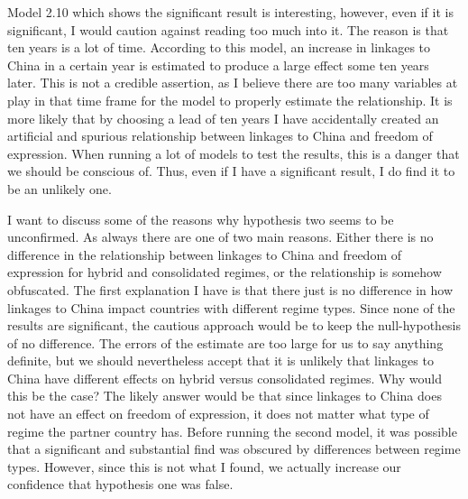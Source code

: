 Model 2.10 which shows the significant result is interesting, however, even if it is significant, I would caution against reading too much into it. The reason is that ten years is a lot of time. According to this model, an increase in linkages to China in a certain year is estimated to produce a large effect some ten years later. This is not a credible assertion, as I believe there are too many variables at play in that time frame for the model to properly estimate the relationship. It is more likely that by choosing a lead of ten years I have accidentally created an artificial and spurious relationship between linkages to China and freedom of expression. When running a lot of models to test the results, this is a danger that we should be conscious of. Thus, even if I have a significant result, I do find it to be an unlikely one. 

I want to discuss some of the reasons why hypothesis two seems to be unconfirmed. As always there are one of two main reasons.  Either there is no difference in the relationship between linkages to China and freedom of expression for hybrid  and consolidated regimes, or the relationship is somehow obfuscated. The first explanation I have is that there just is no difference in how linkages to China impact countries with different regime types. Since none of the results are significant, the cautious approach would be to keep the null-hypothesis of no difference. The errors of the estimate are too large for us to say anything definite, but we should nevertheless accept that it is unlikely that linkages to China have different effects on hybrid versus consolidated regimes. Why would this be the case? The likely answer would be that since linkages to China does not have an effect on freedom of expression, it does not matter what type of regime the partner country has. Before running the second model, it was possible that a significant and substantial find was obscured by differences between regime types. However, since this is not what I found, we actually increase our confidence that hypothesis one was false.

